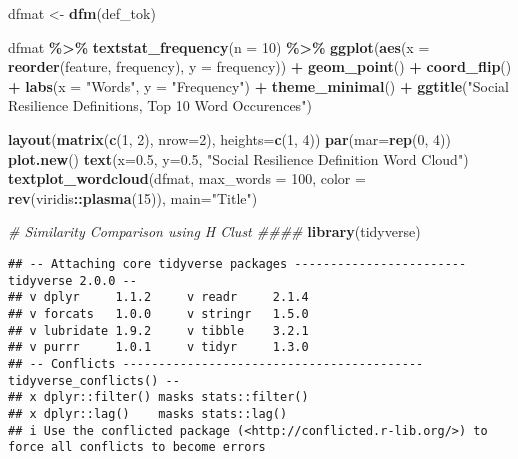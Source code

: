 \documentclass[
]{article}
\newenvironment{Shaded}{\begin{snugshade}}{\end{snugshade}}
\newcommand{\AttributeTok}[1]{\textcolor[rgb]{0.13,0.29,0.53}{#1}}
\newcommand{\CommentTok}[1]{\textcolor[rgb]{0.56,0.35,0.01}{\textit{#1}}}
\newcommand{\DecValTok}[1]{\textcolor[rgb]{0.00,0.00,0.81}{#1}}
\newcommand{\FloatTok}[1]{\textcolor[rgb]{0.00,0.00,0.81}{#1}}
\newcommand{\FunctionTok}[1]{\textcolor[rgb]{0.13,0.29,0.53}{\textbf{#1}}}
\newcommand{\NormalTok}[1]{#1}
\newcommand{\OtherTok}[1]{\textcolor[rgb]{0.56,0.35,0.01}{#1}}
\newcommand{\SpecialCharTok}[1]{\textcolor[rgb]{0.81,0.36,0.00}{\textbf{#1}}}
\newcommand{\StringTok}[1]{\textcolor[rgb]{0.31,0.60,0.02}{#1}}
\begin{document}
\begin{Shaded}
\begin{Highlighting}[]
\NormalTok{dfmat }\OtherTok{\textless{}{-}} \FunctionTok{dfm}\NormalTok{(def\_tok)}

\NormalTok{dfmat }\SpecialCharTok{\%\textgreater{}\%} 
  \FunctionTok{textstat\_frequency}\NormalTok{(}\AttributeTok{n =} \DecValTok{10}\NormalTok{) }\SpecialCharTok{\%\textgreater{}\%} 
  \FunctionTok{ggplot}\NormalTok{(}\FunctionTok{aes}\NormalTok{(}\AttributeTok{x =} \FunctionTok{reorder}\NormalTok{(feature, frequency), }\AttributeTok{y =}\NormalTok{ frequency)) }\SpecialCharTok{+}
  \FunctionTok{geom\_point}\NormalTok{() }\SpecialCharTok{+}
  \FunctionTok{coord\_flip}\NormalTok{() }\SpecialCharTok{+}
  \FunctionTok{labs}\NormalTok{(}\AttributeTok{x =} \StringTok{"Words"}\NormalTok{, }\AttributeTok{y =} \StringTok{"Frequency"}\NormalTok{) }\SpecialCharTok{+}
  \FunctionTok{theme\_minimal}\NormalTok{() }\SpecialCharTok{+} 
  \FunctionTok{ggtitle}\NormalTok{(}\StringTok{"Social Resilience Definitions, Top 10 Word Occurences"}\NormalTok{)}

\FunctionTok{layout}\NormalTok{(}\FunctionTok{matrix}\NormalTok{(}\FunctionTok{c}\NormalTok{(}\DecValTok{1}\NormalTok{, }\DecValTok{2}\NormalTok{), }\AttributeTok{nrow=}\DecValTok{2}\NormalTok{), }\AttributeTok{heights=}\FunctionTok{c}\NormalTok{(}\DecValTok{1}\NormalTok{, }\DecValTok{4}\NormalTok{))}
\FunctionTok{par}\NormalTok{(}\AttributeTok{mar=}\FunctionTok{rep}\NormalTok{(}\DecValTok{0}\NormalTok{, }\DecValTok{4}\NormalTok{))}
\FunctionTok{plot.new}\NormalTok{()}
\FunctionTok{text}\NormalTok{(}\AttributeTok{x=}\FloatTok{0.5}\NormalTok{, }\AttributeTok{y=}\FloatTok{0.5}\NormalTok{, }\StringTok{"Social Resilience Definition Word Cloud"}\NormalTok{)}
\FunctionTok{textplot\_wordcloud}\NormalTok{(dfmat, }\AttributeTok{max\_words =} \DecValTok{100}\NormalTok{, }\AttributeTok{color =} \FunctionTok{rev}\NormalTok{(viridis}\SpecialCharTok{::}\FunctionTok{plasma}\NormalTok{(}\DecValTok{15}\NormalTok{)), }\AttributeTok{main=}\StringTok{"Title"}\NormalTok{)}

\CommentTok{\# Similarity Comparison using H Clust \#\#\#\#}
\FunctionTok{library}\NormalTok{(tidyverse)}
\end{Highlighting}
\end{Shaded}

\begin{verbatim}
## -- Attaching core tidyverse packages ------------------------ tidyverse 2.0.0 --
## v dplyr     1.1.2     v readr     2.1.4
## v forcats   1.0.0     v stringr   1.5.0
## v lubridate 1.9.2     v tibble    3.2.1
## v purrr     1.0.1     v tidyr     1.3.0
## -- Conflicts ------------------------------------------ tidyverse_conflicts() --
## x dplyr::filter() masks stats::filter()
## x dplyr::lag()    masks stats::lag()
## i Use the conflicted package (<http://conflicted.r-lib.org/>) to force all conflicts to become errors
\end{verbatim}
\end{document}
